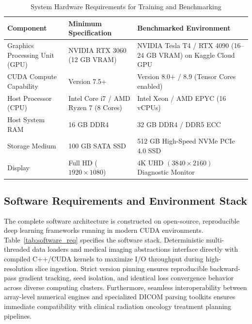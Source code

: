 \begin{table}[htbp]
\centering
\caption{System Hardware Requirements for Training and Benchmarking}
\label{tab:hardware_req}
\small
\renewcommand{\arraystretch}{1.3}
\begin{tabularx}{\textwidth}{@{} l p{5.5cm} X @{}}
\toprule
\textbf{Component} & \textbf{Minimum Specification} & \textbf{Benchmarked Environment} \\
\midrule
Graphics Processing Unit (GPU) & NVIDIA RTX 3060 (12 GB VRAM) & NVIDIA Tesla T4 / RTX 4090 (16--24 GB VRAM) on Kaggle Cloud GPU~\cite{kaggle2024platform} \\
CUDA Compute Capability & Version 7.5+ & Version 8.0+ / 8.9 (Tensor Cores enabled) \\
Host Processor (CPU) & Intel Core i7 / AMD Ryzen 7 (8 Cores) & Intel Xeon / AMD EPYC (16 vCPUs) \\
Host System RAM & 16 GB DDR4 & 32 GB DDR4 / DDR5 ECC \\
Storage Medium & 100 GB SATA SSD & 512 GB High-Speed NVMe PCIe 4.0 SSD \\
Display & Full HD ($1920 \times 1080$) & $4\text{K UHD } (3840 \times 2160)$ Diagnostic Monitor \\
\bottomrule
\end{tabularx}
\end{table}

\subsection{Software Requirements and Environment Stack}
The complete software architecture is constructed on open-source, reproducible deep learning frameworks running in modern CUDA environments. Table~\ref{tab:software_req} specifies the software stack. Deterministic multi-threaded data loaders and medical imaging abstractions interface directly with compiled C++/CUDA kernels to maximize I/O throughput during high-resolution slice ingestion. Strict version pinning ensures reproducible backward-pass gradient tracking, seed isolation, and identical loss convergence behavior across diverse computing clusters. Furthermore, seamless interoperability between array-level numerical engines and specialized DICOM parsing toolkits ensures immediate compatibility with clinical radiation oncology treatment planning pipelines.

